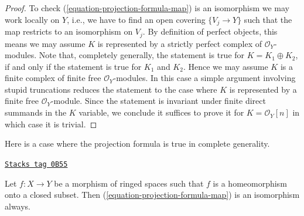 \begin{proof}
To check (\ref{equation-projection-formula-map}) is an isomorphism
we may work locally on $Y$, i.e., we have to find an open covering
$\{V_j \to Y\}$
such that the map restricts to an isomorphism on $V_j$. By definition
of perfect objects, this means we may assume $K$ is represented by
a strictly perfect complex of $\mathcal{O}_Y$-modules.
Note that, completely generally, the statement is true for
$K = K_1 \oplus K_2$, if and only if the statement is true for
$K_1$ and $K_2$. Hence we may assume $K$ is a finite
complex of finite free $\mathcal{O}_Y$-modules.
In this case a simple argument involving stupid truncations reduces
the statement to the case where $K$ is represented by a finite
free $\mathcal{O}_Y$-module. Since the statement is invariant
under finite direct summands in the $K$ variable, we conclude
it suffices to prove it for $K = \mathcal{O}_Y[n]$
in which case it is trivial.
\end{proof}

Here is a case where the projection formula is true in complete
generality.

\begin{lemma}
\label{cohomology-lemma-projection-formula-closed-immersion}
\href{https://stacks.math.columbia.edu/tag/0B55}{\texttt{Stacks tag 0B55}}

Let $f : X \to Y$ be a morphism of ringed spaces such that $f$ is a
homeomorphism onto a closed subset. Then
(\ref{equation-projection-formula-map}) is an isomorphism always.
\end{lemma}


